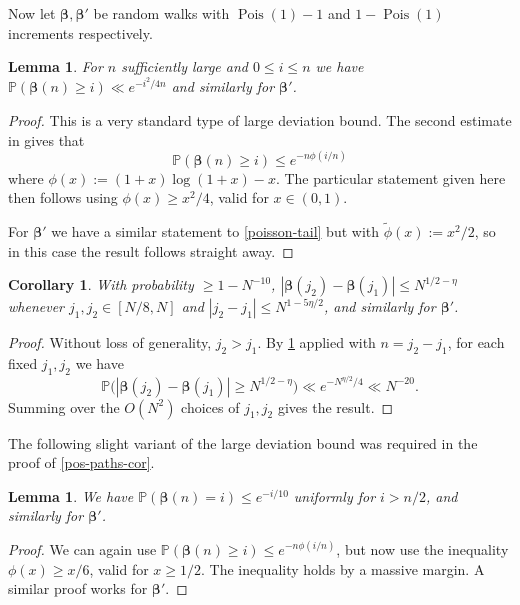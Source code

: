 \documentclass[11pt,reqno]{amsart}
\numberwithin{equation}{section}
\newtheorem{lemma}[theorem]{Lemma}
\newtheorem{corollary}[theorem]{Corollary}
\theoremstyle{definition}
\theoremstyle{remark}
\newcommand{\mb}{\mathbb}
\newcommand\Pois{\operatorname{Pois}}
\def\boldbeta{\boldsymbol\beta}
\renewcommand{\le}{\leqslant}
\renewcommand{\ge}{\geqslant}
\begin{document}
Now let $\boldbeta, \boldbeta'$ be random walks with $\Pois(1) - 1$ and $1 - \Pois(1)$ increments respectively. 

\begin{lemma}\label{lemmaF.1}
For $n$ sufficiently large and $0 \le i \le n$ we have $\mb{P}(\boldbeta(n) \ge i) \ll  e^{-i^2/4n}$ and similarly for $\boldbeta'$.
\end{lemma}
\begin{proof}
This is a very standard type of large deviation bound. The second estimate in \cite[Theorem A.1.15]{alon-spencer} gives that \begin{equation}\label{poisson-tail} \mb{P}(\boldbeta(n) \ge i) \le e^{-n \phi(i/n)}\end{equation} where $\phi(x) := (1 + x) \log (1 + x) - x$. The particular statement given here then follows using $\phi(x) \ge x^2/4$, valid for $x \in (0,1)$.

For $\boldbeta'$ we have a similar statement to \cref{poisson-tail} but with $\tilde\phi(x) := x^2/2$, so in this case the result follows straight away.
\end{proof}

\begin{corollary}\label{cor-F2}
With probability $\ge 1 - N^{-10}$, $|\boldbeta(j_2) - \boldbeta(j_1)| \le N^{1/2 - \eta}$ whenever $j_1, j_2 \in [N/8, N]$ and $|j_2 - j_1| \le N^{1 - 5\eta/2}$, and similarly for $\boldbeta'$.
\end{corollary}
\begin{proof} Without loss of generality, $j_2 > j_1$. 
By \cref{lemmaF.1} applied with $n = j_2 - j_1$, for each fixed $j_1, j_2$ we have 
\[ \mb{P} \big( |\boldbeta(j_2) - \boldbeta(j_1)| \ge N^{1/2 - \eta}\big) \ll e^{-N^{\eta/2}/4} \ll N^{-20}.\]
Summing over the $O(N^2)$ choices of $j_1, j_2$ gives the result.     
\end{proof}

The following slight variant of the large deviation bound was required in the proof of \cref{pos-paths-cor}.
\begin{lemma}\label{large-deviation-2}
We have $\mb{P}(\boldbeta(n) = i) \le e^{-i/10}$ uniformly for $i > n/2$, and similarly for $\boldbeta'$.
\end{lemma}
\begin{proof}
We can again use $\mb{P}(\boldbeta(n) \ge i) \le e^{-n\phi(i/n)}$, but now use the inequality $\phi(x) \ge x/6$, valid for $x \ge 1/2$. The inequality holds by a massive margin. A similar proof works for $\boldbeta'$.
\end{proof}



\end{document}
